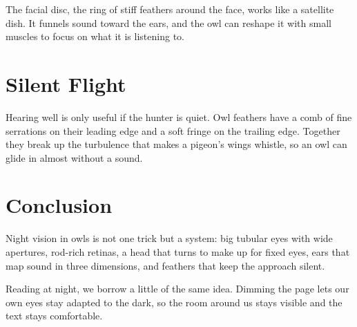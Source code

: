 \documentclass[11pt]{article}
\begin{document}
The facial disc, the ring of stiff feathers around the face, works like a
satellite dish. It funnels sound toward the ears, and the owl can reshape it
with small muscles to focus on what it is listening to.

\section{Silent Flight}
Hearing well is only useful if the hunter is quiet. Owl feathers have a comb of
fine serrations on their leading edge and a soft fringe on the trailing edge.
Together they break up the turbulence that makes a pigeon's wings whistle, so an
owl can glide in almost without a sound.

\section{Conclusion}
Night vision in owls is not one trick but a system: big tubular eyes with wide
apertures, rod-rich retinas, a head that turns to make up for fixed eyes, ears
that map sound in three dimensions, and feathers that keep the approach silent.

Reading at night, we borrow a little of the same idea. Dimming the page lets our
own eyes stay adapted to the dark, so the room around us stays visible and the
text stays comfortable.
\end{document}

